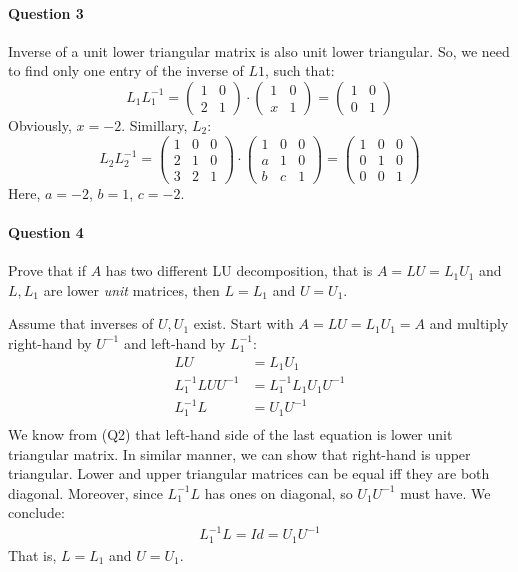 \paragraph{Question 3}
Inverse of a unit lower triangular matrix is also unit lower triangular.
So, we need to find only one entry of the inverse of $L1$, such that:
\begin{equation*}
L_1 L_1^{-1} =
\begin{pmatrix}
1 & 0\\
2 & 1
\end{pmatrix}
\cdot
\begin{pmatrix}
1 & 0\\
x & 1
\end{pmatrix}
=
\begin{pmatrix}
1 & 0 \\
0 & 1
\end{pmatrix}
\end{equation*}
Obviously, $x=-2$. Simillary, $L_2$:
\begin{equation*}
L_2 L_2^{-1} =
\begin{pmatrix}
1 & 0 & 0 \\
2 & 1 & 0 \\
3 & 2 & 1
\end{pmatrix}
\cdot
\begin{pmatrix}
1 & 0 & 0 \\
a & 1 & 0 \\
b & c & 1
\end{pmatrix}
=
\begin{pmatrix}
1 & 0 & 0 \\
0 & 1 & 0 \\
0 & 0 & 1
\end{pmatrix}
\end{equation*}
Here, $a = -2$, $b = 1$, $c = -2$.

\paragraph{Question 4}
Prove that if $A$ has two different LU decomposition, that is $A = LU = L_1U_1$ and $L, L_1$ are lower \emph{unit} matrices, then $L=L_1$ and $U=U_1$.

Assume that inverses of $U, U_1$ exist.
Start with $A= LU = L_1 U_1 = A$ and multiply right-hand by $U^{-1}$ and left-hand by $L_1^{-1}$:
\begin{align*}
    LU &= L_1 U_1 \\
    L_1^{-1} L U U^{-1} &= L_1^{-1} L_1 U_1 U^{-1} \\
    L_1^{-1} L  &=  U_1 U^{-1} \\
\end{align*}
We know from (Q2) that left-hand side of the last equation is lower unit triangular matrix.
In similar manner, we can show that right-hand is upper triangular.
Lower and upper triangular matrices can be equal iff they are both diagonal.
Moreover, since $L_1^{-1} L$ has ones on diagonal, so $U_1 U^{-1}$ must have.
We conclude:
\begin{align*}
     L_1^{-1} L = Id = U_1 U^{-1}
\end{align*}
That is, $L = L_1$ and $U = U_1$.
 

